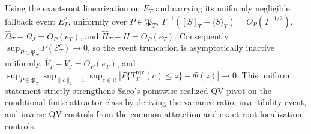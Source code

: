 Using the exact-root linearization on \(E_T\) and carrying its uniformly negligible fallback event \(E_T^c\), uniformly over \(P\in\mathfrak P_T\), \(T^{-1}([S]_T-\langle S\rangle_T)=O_P(T^{-1/2})\), \(\widehat\Omega_T-\Omega_J=O_P(e_T)\), and \(\widehat H_T-H=O_P(e_T)\). Consequently \(\sup_{P\in\mathfrak P_T}P(\mathcal E_T^c)\to0\), so the event truncation is asymptotically inactive uniformly, \(\widehat V_T-V_J=O_P(e_T)\), and \(\sup_{P\in\mathfrak P_T}\sup_{\|c\|_2=1}\sup_{z\in\mathbb R}|P\{T_T^{\mathrm{rqv}}(c)\le z\}-\Phi(z)|\to0\). This uniform statement strictly strengthens Saco's pointwise realized-QV pivot on the conditional finite-attractor class by deriving the variance-ratio, invertibility-event, and inverse-QV controls from the common attraction and exact-root localization controls.
